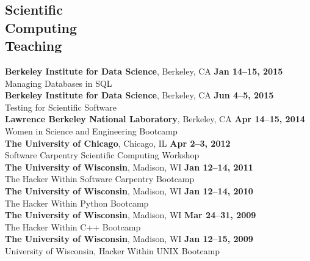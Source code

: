 \documentclass[margin,line]{resume}
\begin{document}
\begin{resume}
    \section{\mysidestyle Scientific\\Computing\\Teaching}
    \textbf{Berkeley Institute for Data Science}, Berkeley, CA \hfill 
    \textbf{Jan 14--15, 2015}\\
    Managing Databases in SQL
               \vspace{2mm}\\
    \textbf{Berkeley Institute for Data Science}, Berkeley, CA \hfill \textbf{Jun 4--5, 2015}\\
    Testing for Scientific Software
               \vspace{2mm}\\
    \textbf{Lawrence Berkeley National Laboratory}, Berkeley, CA \hfill \textbf{Apr 14--15, 2014}\\
    Women in Science and Engineering Bootcamp
               \vspace{2mm}\\
    \textbf{The University of Chicago}, Chicago, IL \hfill \textbf{Apr 2--3, 2012}\\
    Software Carpentry Scientific Computing Workshop
               \vspace{2mm}\\
    \textbf{The University of Wisconsin}, Madison, WI \hfill\textbf{Jan 12--14, 2011}\\
    The Hacker Within Software Carpentry Bootcamp
               \vspace{2mm}\\
    \textbf{The University of Wisconsin}, Madison, WI \hfill \textbf{Jan 12--14, 2010}\\
    The Hacker Within Python Bootcamp
               \vspace{2mm}\\
    \textbf{The University of Wisconsin}, Madison, WI \hfill \textbf{Mar 24--31, 2009}\\
    The Hacker Within C++ Bootcamp
               \vspace{2mm}\\
    \textbf{The University of Wisconsin}, Madison, WI \hfill \textbf{Jan 12--15, 2009}\\
    University of Wisconsin, Hacker Within UNIX Bootcamp\\

\end{resume}
\end{document}
